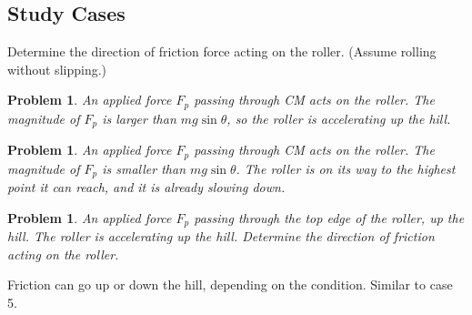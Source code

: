 \documentclass{article}
\newtheorem{problem}[theorem]{Problem}
\begin{document}
\newpage

\subsection{Study Cases}

Determine the direction of friction force acting on the roller. (Assume
rolling without slipping.)

\begin{problem}
An applied force $F_{p}$ passing through CM acts on the roller. The
magnitude of $F_{p}$ is larger than $mg\sin \theta $, so the roller is
accelerating up the hill.
\end{problem}





\newpage

\begin{problem}
An applied force $F_{p}$ passing through CM acts on the roller. The
magnitude of $F_{p}$ is smaller than $mg\sin \theta $. The roller is on its
way to the highest point it can reach, and it is already slowing down.
\end{problem}





\newpage

\begin{problem}
An applied force $F_{p}$ passing through the top edge of the roller, up the
hill. The roller is accelerating up the hill. Determine the direction of
friction acting on the roller.
\end{problem}



\bigskip 

Friction can go up or down the hill, depending on the condition. Similar to
case 5.


\end{document}
